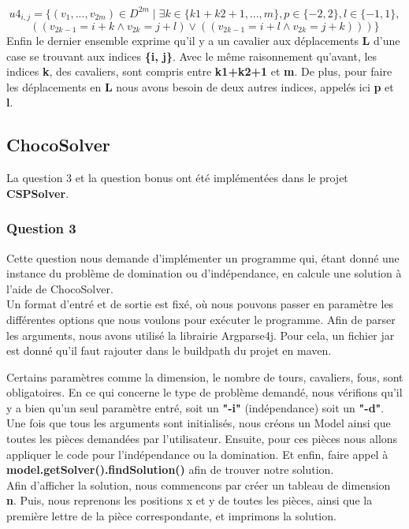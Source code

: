 \documentclass{article}
\begin{document}
$$u4_{i,j} = \{(v_{1}, ..., v_{2m}) \in  D^{2m} \mid \exists k \in \{k1+k2+1, ..., m\}, p \in \{-2, 2 \}, l \in \{-1, 1\},$$
 $$((v_{2k-1} = i+k \wedge v_{2k} = j+l)  \vee ((v_{2k-1} = i+l \wedge v_{2k} = j+k)))\}$$
Enfin le dernier ensemble exprime qu'il y a un cavalier aux déplacements \textbf{L} d'une case se trouvant aux indices \textbf{\{i, j\}}. Avec le même raisonnement qu'avant, les indices \textbf{k}, des cavaliers, sont compris entre \textbf{k1+k2+1} et \textbf{m}. De plus, pour faire les déplacements en \textbf{L} nous avons besoin de deux autres indices, appelés ici \textbf{p} et \textbf{l}.

\subsection{ChocoSolver}
La question 3 et la question bonus ont été implémentées dans le projet \textbf{CSPSolver}. 
\subsubsection{Question 3}
Cette question nous demande d'implémenter un programme qui, étant donné une instance du problème de domination ou d'indépendance, en calcule une solution à l'aide de ChocoSolver.\\

Un format d'entré et de sortie est fixé, où nous pouvons passer en paramètre les différentes options que nous voulons pour exécuter le programme. 
Afin de parser les arguments, nous avons utilisé la librairie Argparse4j. Pour cela, un fichier jar est donné qu'il faut rajouter dans le buildpath du projet en maven. 

Certains paramètres comme la dimension, le nombre de tours, cavaliers, fous, sont obligatoires. En ce qui concerne le type de problème demandé, nous vérifions qu'il y a bien qu'un seul paramètre entré, soit un \textbf{"-i"} (indépendance) soit un \textbf{"-d"}. \\

Une fois que tous les arguments sont initialisés, nous créons un Model ainsi que toutes les pièces demandées par l'utilisateur. Ensuite, pour ces pièces nous allons appliquer le code pour l'indépendance ou la domination. Et enfin, faire appel à \textbf{model.getSolver().findSolution()} afin de trouver notre solution.\\

Afin d'afficher la solution, nous commencons par créer un tableau de dimension \textbf{n}. Puis, nous reprenons les positions x et y de toutes les pièces, ainsi que la première lettre de la pièce correspondante, et imprimons la solution. \\
\end{document}
